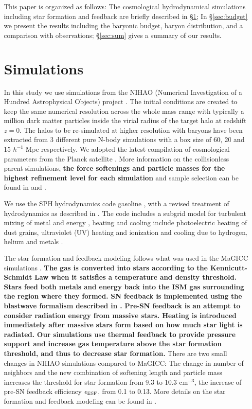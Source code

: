 \documentclass[useAMS,usenatbib]{mn2e}
\begin{document}
This paper is organized as follows: The cosmological hydrodynamical
simulations including star formation and feedback are briefly
described in  \S\ref{sec:sims}; In \S\ref{sec:budget} we present the
results including the baryonic budget, baryon distribution, and a
comparison with observations; \S\ref{sec:sum} gives a summary of our
results.

\section{Simulations} 
\label{sec:sims}

In this study we use simulations from the NIHAO (Numerical
Investigation of a Hundred Astrophysical Objects) project
\citep{Wang15}.   The initial conditions are created to keep the same
numerical resolution across the whole mass range with typically a
million dark matter particles inside the virial radius of the target
halo at  redshift $z=0$.  The halos to be re-simulated at higher
resolution with baryons have been extracted from 3 different pure
N-body simulations with a box size of 60, 20 and 15 $h^{-1}$ Mpc
respectively.  We adopted the  latest compilation of cosmological
parameters from the Planck  satellite \citep{Planck14}.  More
information on the collisionless parent simulations, {\bf the force
  softenings and particle masses for the highest refinement level for
  each simulation} and sample  selection can be found in
\citet{Dutton14} and \citet{Wang15}.

We use the SPH hydrodynamics code {\sc gasoline} \citep{Wadsley04},
with a revised treatment of  hydrodynamics as described in
\citet{Keller14}.  The code includes a subgrid model for turbulent
mixing of metal and energy \citep{Wadsley08}, heating and cooling
include photoelectric heating of dust grains, ultraviolet (UV) heating
and ionization and  cooling due to hydrogen, helium and metals
\citep{Shen10}.  

The star formation and feedback modeling follows what was used in the
MaGICC simulations \citep{Stinson13}.   {\bf The gas is converted into
  stars according to the Kennicutt-Schmidt Law when it satisfies a
  temperature and density threshold. Stars feed both metals and energy
  back into the ISM gas surrounding the region where they formed. SN
  feedback is implemented using the blastwave formalism described in
  \citet{Stinson06}. Pre-SN feedback is an attempt to consider
  radiation energy from massive stars. Heating is introduced
  immediately after massive stars form based on how much star light is
  radiated.  Our simulations use thermal feedback to provide pressure
  support and  increase gas temperature above the star formation
  threshold, and thus to decrease star formation.}  There are two
small changes in NIHAO simulations compared to MaGICC:
The change in  number of neighbors
and the new combination of softening length and  particle mass
increases the threshold for star formation from  9.3 to 10.3
cm$^{-3}$, the increase of pre-SN feedback efficiency $\epsilon_{\rm
  ESF}$, from 0.1 to 0.13.  More details on the star formation and
feedback modeling can be found in \citet{Wang15}.
\end{document}
